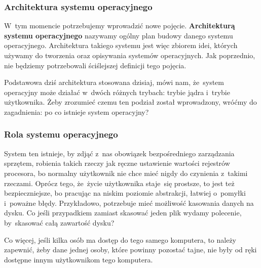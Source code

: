 \documentclass[10pt,t]{beamer}
\begin{document}
\begin{frame}
  \frametitle{Architektura systemu operacyjnego}


  W~tym momencie potrzebujemy wprowadzić nowe pojęcie.
  \textbf{Architekturą systemu operacyjnego} nazywamy ogólny plan budowy
  danego systemu operacyjnego. Architektura takiego systemu jest więc
  zbiorem idei, których używamy do tworzenia oraz opisywania systemów
  operacyjnych. Jak poprzednio, nie będziemy potrzebowali ściślejszej
  definicji tego pojęcia.

  Podstawowa dziś architektura stosowana dzisiaj, mówi nam, że~system
  operacyjny może działać w~dwóch różnych trybach: trybie jądra i~trybie
  użytkownika. Żeby zrozumieć czemu ten podział został wprowadzony,
  wróćmy do zagadnienia: po co istnieje system operacyjny?

\end{frame}





\begin{frame}
  \frametitle{Rola systemu operacyjnego}


  System ten istnieje, by zdjąć z~nas obowiązek bezpośredniego zarządzania
  sprzętem, robienia takich rzeczy jak ręczne ustawienie wartości rejestrów
  procesora, bo normalny użytkownik nie chce mieć nigdy do czynienia
  z~takimi rzeczami. Oprócz tego, że~życie użytkownika staje~się prostsze,
  to jest też bezpieczniejsze, bo pracując na niskim poziomie abstrakcji,
  łatwiej o~pomyłki i~poważne błędy. Przykładowo, potrzebuje mieć możliwość
  kasowania danych na dysku. Co jeśli przypadkiem zamiast skasować jeden
  plik wydamy polecenie, by~skasować całą zawartość dysku?

  Co więcej, jeśli kilka osób ma dostęp do tego samego komputera, to
  należy zapewnić, żeby dane jednej osoby, które powinny pozostać tajne, nie
  były od ręki dostępne innym użytkownikom tego komputera.

\end{frame}
\end{document}
